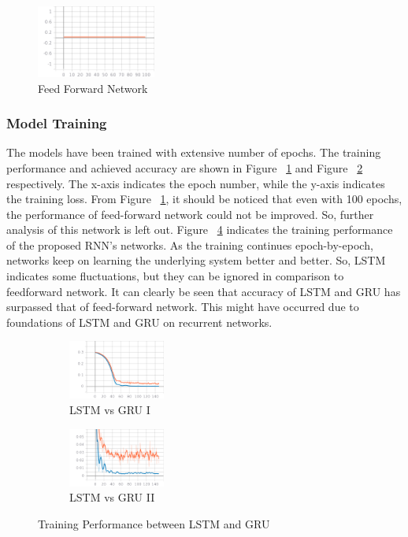 \begin{figure}[h!]
	\centering
	\includegraphics[width=0.35\textwidth]{fig/epoch_accuracy.png}
	\caption{Feed Forward Network}
	\label{fig:feedforward}
\end{figure}



\subsubsection{Model Training}

The models have been trained with extensive number of epochs. The training performance and achieved accuracy are shown in Figure ~\ref{fig:feedforward} and Figure ~\ref{fig:trg} respectively. The x-axis indicates the epoch number, while the y-axis indicates the training loss. From Figure ~\ref{fig:feedforward}, it should be noticed that even with 100 epochs, the performance of feed-forward network could not be improved. So, further analysis of this network is left out. Figure ~\ref{fig:train} indicates the training performance of the proposed RNN’s networks. As the training continues epoch-by-epoch, networks keep on learning the underlying system better and better. So, LSTM indicates some fluctuations, but they can be ignored in comparison to feedforward network. It can clearly be seen that accuracy of LSTM and GRU has surpassed that of feed-forward network. This might have occurred due to foundations of LSTM and GRU on recurrent networks. 

\begin{figure}[h!]
	\centering
	\begin{subfigure}{.5\textwidth}
		\includegraphics[width=0.35\textwidth]{fig/trg.png}
		\caption{LSTM vs GRU I}
		\label{fig:trg}
	\end{subfigure}%
	\begin{subfigure}{.5\textwidth}
		\centering
		\includegraphics[width=0.35\textwidth]{fig/train.png}
		\caption{LSTM vs GRU II}
		\label{fig:train}
	\end{subfigure}	
	\caption{Training Performance between LSTM and GRU}
\end{figure}

